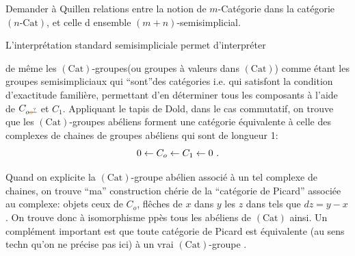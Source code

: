\margin{\handwritten{\(\Vert\)}}%
 Demander à Quillen relations entre la notion de $m$-Catégorie dans la catégorie $(n\text{-}\mathrm{Cat})$, et celle d ensemble $(m+n)$-semisimplicial. 

L'interprétation standard semisimpliciale permet d'interpréter


de même les $(\mathrm{Cat})$-groupes(ou groupes à valeurs dans $(\mathrm{Cat})$) comme étant les groupes semisimpliciaux qui ``sont''des catégories i.e. qui  satisfont la condition d'exactitude familière, permettant d'en déterminer tous les composants à l'aide de $C_{o\deleted{\unsure{o}}}$ et $C_1$. Appliquant le tapis de Dold, dans le cas commutatif, on trouve que les $(\mathrm{Cat})$-groupes abéliens forment une catégorie équivalente à celle des complexes de chaines de groupes abéliens qui sont de longueur 1:
\[
0\handwritten{\leftarrow}C_o\handwritten{\leftarrow}C_1\handwritten{\leftarrow}0\ .
\]

Quand on explicite la $(\mathrm{Cat})$-groupe abélien associé à un tel complexe de chaines, on trouve ``ma'' construction chérie de la ``catégorie de Picard'' associée au complexe: objets ceux de $C_o$, flêches de $x$ dans $y$ les $z$ dans  tels que $dz=y-x$. On trouve donc à isomorphisme ppès tous les  abéliens de $(\mathrm{Cat})$ ainsi. Un complément important est que toute catégorie de Picard  est équivalente (au sens techn qu'on ne précise pas ici) à  un vrai $(\mathrm{Cat})$-groupe .

